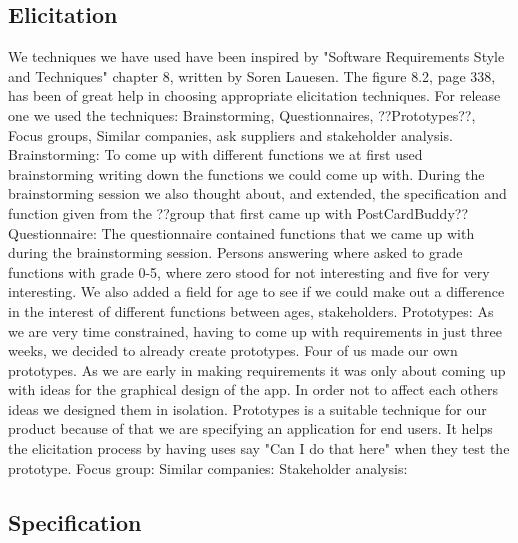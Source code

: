 \documentclass[10pt,a4paper]{article}
\begin{document}
\subsection{Elicitation}
We techniques we have used have been inspired by "Software Requirements Style and Techniques" chapter 8, written by Soren Lauesen. The figure 8.2, page 338, has been of great help in choosing appropriate elicitation techniques.
For release one we used the techniques: Brainstorming, Questionnaires, ??Prototypes??, Focus groups, Similar companies, ask suppliers and stakeholder analysis.
\newline
Brainstorming: To come up with different functions we at first used brainstorming writing down the functions we could come up with. During the brainstorming session we also thought about, and extended, the specification and function given from the ??group that first came up with PostCardBuddy??
\newline
Questionnaire: The questionnaire contained functions that we came up with during the brainstorming session. Persons answering where asked to grade functions with grade 0-5, where zero stood for not interesting and five for very interesting. We also added a field for age to see if we could make out a difference in the interest of different functions between ages, stakeholders.
\newline
Prototypes: As we are very time constrained, having to come up with requirements in just three weeks, we decided to already create prototypes. Four of us made our own prototypes. As we are early in making requirements it was only about coming up with ideas for the graphical design of the app. In order not to affect each others ideas we designed them in isolation. 
Prototypes is a suitable technique for our product because of that we are specifying an application for end users.  It helps the elicitation process by having uses say "Can I do that here" when they test the prototype. 
\newline
Focus group:
\newline
Similar companies:
\newline
Stakeholder analysis:



\subsection{Specification}

\end{document}
